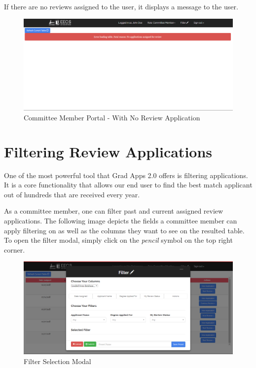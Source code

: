\documentclass[fontsize=12pt,paper=letter,twoside]{scrartcl}
\begin{document}
\newpage
\noindent If there are no reviews assigned to the user, it displays a message to the user.

\begin{figure}[!htb]
\begin{center}
\includegraphics[width=.9\textwidth]{images/err_default.png}
\end{center}
\caption{Committee Member Portal - With No Review Application}
\label{fig:cm_portal_err}
\end{figure}
 
\section{Filtering Review Applications}

One of the most powerful tool that Grad Apps 2.0 offers is filtering applications. It is a core functionality that allows our end user to find the best match applicant out of hundreds that are received every year.

\bigskip

\noindent As a committee member, one can filter past and current assigned review applications. The following image depicts the fields a committee member can apply filtering on as well as the columns they want to see on the resulted table. To open the filter modal, simply click on the \emph{pencil} symbol on the top right corner.

\clearpage
\begin{figure}[!htb]
\begin{center}
\includegraphics[width=.9\textwidth]{images/default_filter_view.png}
\end{center}
\caption{Filter Selection Modal}
\label{fig:def_filter_modal}
\end{figure}
\end{document}
